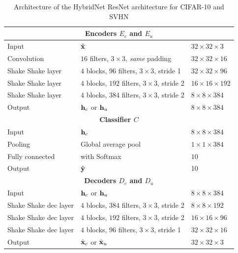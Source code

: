 \begin{table}[htbp]
\centering
\caption{Architecture of the HybridNet ResNet architecture for CIFAR-10 and SVHN}
\label{hybridnetA:table:resnet}
\begin{threeparttable}
\setlength{\tabcolsep}{4pt}
\begin{tabular}{ l l l}
\toprule
\multicolumn{3}{c}{\textbf{Encoders $E_c$ and $E_u$}} \\
\midrule
Input & $\tilde{\mathbf{x}}$ & $32\times 32\times 3$ \\
Convolution & $16$ filters, $3\times3$, \textit{same} padding & $32\times 32\times 16$ \\

Shake Shake layer & $4$ blocks, $96$ filters, $3\times3$,  stride 1 & $32\times 32\times 96$ \\
Shake Shake layer & $4$ blocks, $192$ filters, $3\times3$,  stride 2 & $16\times 16\times 192$ \\
Shake Shake layer & $4$ blocks, $384$ filters, $3\times3$,  stride 2 & $8\times 8\times 384$ \\
Output & $\mathbf{h}_c$ or $\mathbf{h}_u$ & $8\times 8\times 384$ \\

\toprule
\multicolumn{3}{c}{\textbf{Classifier $C$}}\\
\midrule
Input & $\mathbf{h}_c$& $8\times 8\times 384$ \\
Pooling & Global average pool & $1\times 1\times 384$ \\
Fully connected & with Softmax & $10$ \\
Output & $\hat{\mathbf{y}}$ & 10 \\
\toprule
\multicolumn{3}{c}{\textbf{Decoders $D_c$ and $D_u$}}\\
\midrule
Input & $\mathbf{h}_c$ or $\mathbf{h}_u$ & $8\times 8\times 384$ \\
Shake Shake dec layer & $4$ blocks, $384$ filters, $3\times3$,  stride 2 & $8\times 8\times 192$ \\
Shake Shake dec layer & $4$ blocks, $192$ filters, $3\times3$,  stride 2 & $16\times 16\times 96$ \\
Shake Shake dec layer & $4$ blocks, $96$ filters, $3\times3$,  stride 1 & $32\times 32\times 16$ \\
Output & $\hat{\mathbf{x}}_c$ or $\hat{\mathbf{x}}_u$ & $32\times 32 \times 3$ \\
\bottomrule
\end{tabular}
\begin{tablenotes}
\end{tablenotes}
\end{threeparttable}
\end{table}

